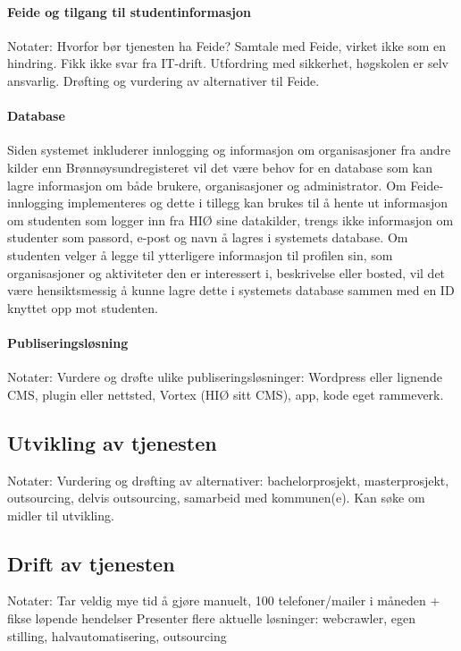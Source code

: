 \paragraph{Feide og tilgang til studentinformasjon}
Notater:
Hvorfor bør tjenesten ha Feide?
Samtale med Feide, virket ikke som en hindring.
Fikk ikke svar fra IT-drift.
Utfordring med sikkerhet, høgskolen er selv ansvarlig.
Drøfting og vurdering av alternativer til Feide.

\paragraph{Database}
Siden systemet inkluderer innlogging og informasjon om organisasjoner fra andre kilder enn Brønnøysundregisteret vil det være behov for en database som kan lagre informasjon om både brukere, organisasjoner og administrator. Om Feide-innlogging implementeres og dette i tillegg kan brukes til å hente ut informasjon om studenten som logger inn fra HIØ sine datakilder, trengs ikke informasjon om studenter som passord, e-post og navn å lagres i systemets database. Om studenten velger å legge til ytterligere informasjon til profilen sin, som organisasjoner og aktiviteter den er interessert i, beskrivelse eller bosted, vil det være hensiktsmessig å kunne lagre dette i systemets database sammen med en ID knyttet opp mot studenten.

\paragraph{Publiseringsløsning}
Notater:
Vurdere og drøfte ulike publiseringsløsninger: Wordpress eller lignende CMS, plugin eller nettsted, Vortex (HIØ sitt CMS), app, kode eget rammeverk.

\subsection{Utvikling av tjenesten}
Notater:
Vurdering og drøfting av alternativer: bachelorprosjekt, masterprosjekt, outsourcing, delvis outsourcing, samarbeid med kommunen(e).
Kan søke om midler til utvikling.

\subsection{Drift av tjenesten}
Notater: 
Tar veldig mye tid å gjøre manuelt, 100 telefoner/mailer i måneden + fikse løpende hendelser
Presenter flere aktuelle løsninger: webcrawler, egen stilling, halvautomatisering, outsourcing


